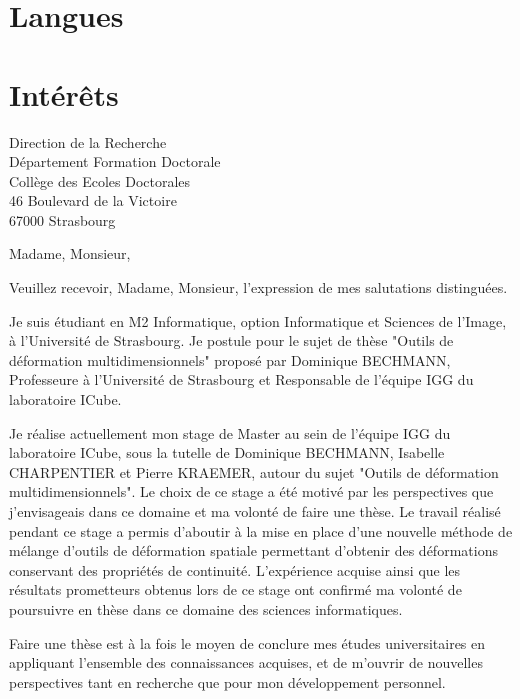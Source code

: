 \documentclass[11pt,a4paper,sans]{moderncv}
\begin{document}
\section{Langues}
\section{Intérêts}

\clearpage
{Direction de la Recherche\\
Département Formation Doctorale\\
Collège des Ecoles Doctorales\\
46 Boulevard de la Victoire\\
67000 Strasbourg}
\date{\mydateformat\today}
\opening{Madame, Monsieur,}
\closing{Veuillez recevoir, Madame, Monsieur, l'expression de mes salutations
distinguées.}
\makelettertitle

Je suis étudiant en M2 Informatique, option Informatique et Sciences de l'Image,
à l'Université de Strasbourg. Je postule pour le sujet de thèse "Outils de
déformation multidimensionnels" proposé par Dominique BECHMANN, Professeure à
l'Université de Strasbourg et Responsable de l'équipe IGG du laboratoire ICube.

Je réalise actuellement mon stage de Master au sein de l'équipe IGG du
laboratoire ICube, sous la tutelle de Dominique BECHMANN, Isabelle CHARPENTIER
et Pierre KRAEMER, autour du sujet "Outils de déformation multidimensionnels".
Le choix de ce stage a été motivé par les perspectives que j'envisageais dans
ce domaine et ma volonté de faire une thèse. Le travail réalisé pendant ce
stage a permis d'aboutir à la mise en place d'une nouvelle méthode de mélange
d'outils de déformation spatiale permettant d'obtenir des déformations
conservant des propriétés de continuité. L'expérience acquise ainsi que les 
résultats prometteurs obtenus lors de ce stage ont confirmé ma volonté de
poursuivre en thèse dans ce domaine des sciences informatiques.

Faire une thèse est à la fois le moyen de conclure mes études universitaires en appliquant l'ensemble des connaissances acquises, et de m'ouvrir de nouvelles perspectives tant en recherche que pour mon développement personnel. 

\makeletterclosing
\end{document}
